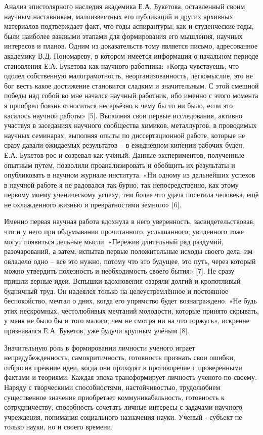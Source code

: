\begin{multicols}{2}
Анализ эпистолярного наследия академика Е.А. Букетова, оставленный своим
научным наставникам, малоизвестных его публикаций и других архивных
материалов подтверждает факт, что годы аспирантуры, как и студенческие
годы, были наиболее важными этапами для формирования его мышления,
научных интересов и планов. Одним из доказательств тому является письмо,
адресованное академику В.Д. Пономареву, в котором имеется информация о
начальном периоде становления Е.А. Букетова как научного работника:
«Когда чувствуешь, что одолел собственную малограмотность,
неорганизованность, легкомыслие, это не бог весть какое достижение
становится сладким и значительным. С этой смешной победы над собой во
мне начался научный работник, ибо именно с этого момента я приобрел
боязнь относиться несерьёзно к чему бы то ни было, если это касалось
научной работы» {[}5{]}. Выполняя свои первые исследования, активно
участвуя в заседаниях научного сообщества химиков, металлургов, в
проводимых научных семинарах, выполняя опыты по диссертационной работе,
которые не сразу давали ожидаемых результатов -- в ежедневном кипении
рабочих буден, Е.А. Букетов рос и созревал как учёный. Данные
экспериментов, полученные опытным путем, позволили проанализировать и
обобщить их результаты и опубликовать в научном журнале института. «Ни
одному из дальнейших успехов в научной работе я не радовался так бурно,
так непосредственно, как этому первому моему ученическому успеху, тем
более что удача посетила человека, ещё не охлажденного жизнью и
превратностями земного» {[}6{]}.

Именно первая научная работа вдохнула в него уверенность,
засвидетельствовав, что и у него при обдумывании прочитанного,
услышанного, увиденного тоже могут появиться дельные мысли. «Пережив
длительный ряд раздумий, разочарований, а затем, испытав первые
положительные исходы своего дела, им овладело одно -- всё это нужно,
потому что это будущее, это путь, через который можно утвердить
полезность и необходимость своего бытия» {[}7{]}. Не сразу пришли верные
идеи. Вспышки вдохновения озаряли долгий и кропотливый будничный труд.
Он надеялся только на целеустремлённое и постоянное беспокойство, мечтал
о днях, когда его упрямство будет вознаграждено. «Не будь этих
нескромных, честолюбивых мечтаний молодости, которые принято скрывать, у
меня не было бы и того малого, чем не смотря ни на что горжусь»,
искренне признавался Е.А. Букетов, уже будучи крупным учёным {[}8{]}.

Значительную роль в формировании личности ученого играет
непредубежденность, самокритичность, готовность признать свои ошибки,
отбросив прежние идеи, когда они приходят в противоречие с проверенными
фактами и теориями. Каждая эпоха трансформирует личность ученого
по-своему. Наряду с творческими способностями, настойчивостью,
трудолюбием существенное значение приобретает коммуникабельность,
готовность к сотрудничеству, способность сочетать личные интересы с
задачами научного учреждения, понимания социального назначения науки.
Ученый - субъект не только науки, но и своего времени.


\end{multicols}
